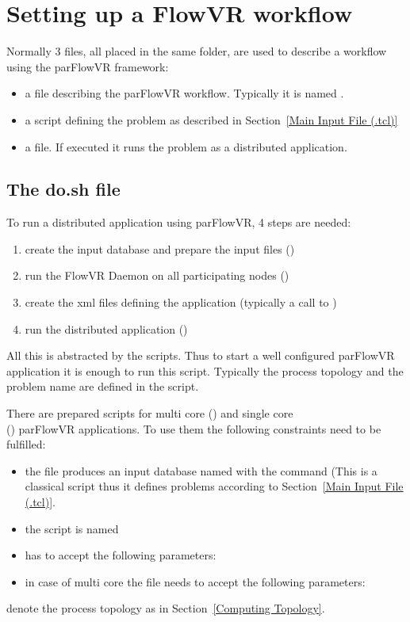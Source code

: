 \section{Setting up a FlowVR workflow}
Normally 3 files, all placed in the same folder, are used to describe a workflow using the parFlowVR framework:
\begin{itemize}
\item a  file describing the parFlowVR workflow. Typically it is named
.
\item a  script defining the \parflow{} problem as described in
Section~\ref{Main Input File (.tcl)}
\item a  file. If executed it runs the problem as a distributed application.
\end{itemize}
\subsection{The do.sh file}
To run a distributed application using parFlowVR, 4 steps are needed:
\begin{enumerate}
\item create the \parflow{} input database and prepare the input files ()
\item run the FlowVR Daemon on all participating nodes ()
\item create the xml files defining the application (typically a call to )
\item run the distributed application ()
\end{enumerate}
All this is abstracted by the  scripts.
Thus to start a well configured parFlowVR application it is enough to run this script.
Typically the process topology and the \parflow{} problem name are defined in the  script.

There are prepared scripts for multi core ()
and single core \\() parFlowVR applications.
To use them the following constraints need to be fulfilled:
\begin{itemize}
\item the  file produces an input database named
   with the  command (This is a classical
    \parflow{}  script thus it defines problems according to
    Section~\ref{Main Input File (.tcl)}.
\item the  script is named 
\item {} has to
  accept the following parameters: 
\item in case of multi core the  file needs to accept the following parameters:
\end{itemize}
   denote the process topology as in Section~\ref{Computing Topology}.
